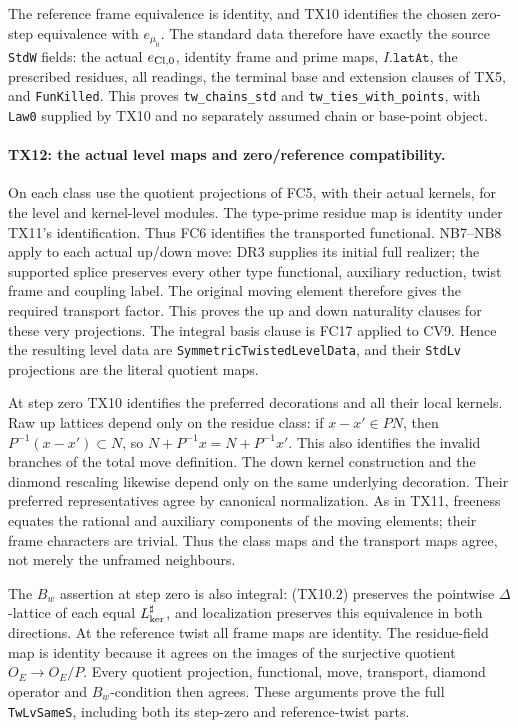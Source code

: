 The reference frame equivalence is identity, and TX10 identifies
the chosen zero-step equivalence with \(e_{\mu_0}\). The standard
data therefore have exactly the source \texttt{StdW} fields:
the actual \(e_{\rm Cl,0}\), identity frame and prime maps,
\(I.\texttt{latAt}\), the prescribed residues, all readings,
the terminal base and extension clauses of TX5, and
\texttt{FunKilled}. This proves \texttt{tw\_chains\_std} and
\texttt{tw\_ties\_with\_points}, with \texttt{Law0} supplied by
TX10 and no separately assumed chain or base-point object.

\paragraph{TX12: the actual level maps and zero/reference compatibility.}
On each class use the quotient projections of FC5, with their
actual kernels, for the level and kernel-level modules.
The type-prime residue map is identity under TX11's
identification. Thus FC6 identifies the transported functional.
NB7--NB8 apply to each actual up/down move: DR3 supplies its
initial full realizer; the supported splice preserves every
other type functional, auxiliary reduction, twist frame and
coupling label. The original moving element therefore gives
the required transport factor. This proves the up and down
naturality clauses for these very projections. The integral
basis clause is FC17 applied to CV9. Hence the resulting level
data are \texttt{SymmetricTwistedLevelData}, and their
\texttt{StdLv} projections are the literal quotient maps.

At step zero TX10 identifies the preferred decorations and
all their local kernels. Raw up lattices depend only on the
residue class: if \(x-x'\in PN\), then
\(P^{-1}(x-x')\subset N\), so
\(N+P^{-1}x=N+P^{-1}x'\). This also identifies the invalid
branches of the total move definition. The down kernel
construction and the diamond rescaling likewise depend only
on the same underlying decoration. Their preferred
representatives agree by canonical normalization. As in TX11,
freeness equates the rational and auxiliary components of the
moving elements; their frame characters are trivial. Thus
the class maps and the transport maps agree, not merely the
unframed neighbours.

The \(B_w\) assertion at step zero is also integral: (TX10.2)
preserves the pointwise \(\Delta\)-lattice of each equal
\(L^\sharp_{\rm ker}\), and localization preserves this
equivalence in both directions. At the reference twist all
frame maps are identity. The residue-field map is identity
because it agrees on the images of the surjective quotient
\(O_E\to O_E/P\). Every quotient projection, functional,
move, transport, diamond operator and \(B_w\)-condition then
agrees. These arguments prove the full \texttt{TwLvSameS},
including both its step-zero and reference-twist parts.

